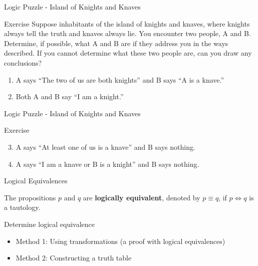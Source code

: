 \documentclass{beamer}
\begin{document}
\begin{frame}[t]{Logic Puzzle - Island of Knights and Knaves}
    \begin{block}{Exercise}
        Suppose inhabitants of the island of knights and knaves, where knights always tell the truth and knaves always lie. You encounter two people, A and B. Determine, if possible, what A and B are if they address you in the ways described. If you cannot determine what these two people are, can you draw any conclusions?
        \begin{enumerate}[1]
            \item A says “The two of us are both knights” and B says “A is a knave.”
            \item Both A and B say “I am a knight.”
        \end{enumerate}
    \end{block}
\end{frame}

\begin{frame}[t]{Logic Puzzle - Island of Knights and Knaves}
    \begin{block}{Exercise}
        \begin{enumerate}
            \setcounter{enumi}{2}
            \item A says “At least one of us is a knave” and B says nothing.
            \item A says “I am a knave or B is a knight” and B says nothing.
        \end{enumerate}
    \end{block}
\end{frame}

\begin{frame}{Logical Equivalences}
    \begin{definition}
        The propositions $p$ and $q$ are \textbf{logically equivalent}, denoted by $p \equiv q$, if $p \Leftrightarrow q$ is a tautology.
    \end{definition}
    \begin{block}{Determine logical equivalence}
        \begin{itemize}
            \item Method 1: Using transformations (a proof with logical equivalences)
            \item Method 2: Constructing a truth table
        \end{itemize}
    \end{block}
\end{frame}
\end{document}
